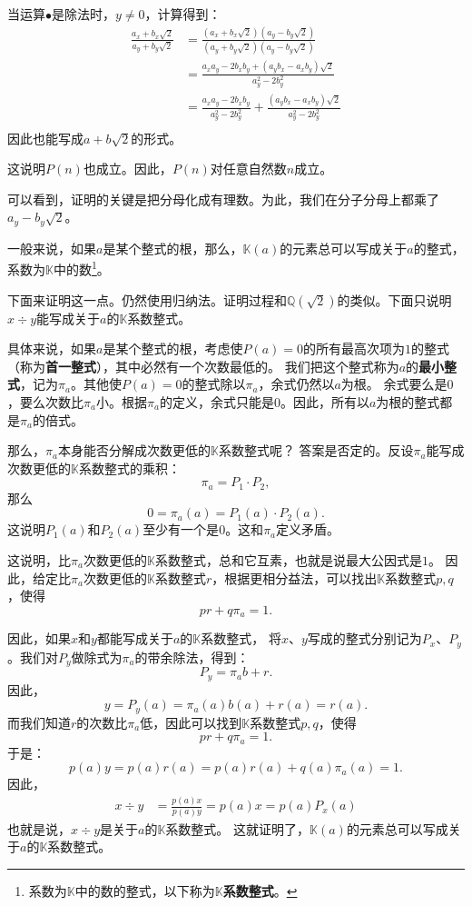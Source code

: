 \documentclass[12pt,UTF8]{ctexbook}
\begin{document}
当运算$\bullet$是除法时，$y\neq 0$，计算得到：
\begin{align*}
    \frac{a_x + b_x\sqrt{2}}{a_y + b_y\sqrt{2}} &=  \frac{(a_x + b_x\sqrt{2})(a_y - b_y\sqrt{2})}{(a_y + b_y\sqrt{2})(a_y - b_y\sqrt{2})} \\
    &= \frac{a_xa_y - 2b_xb_y + (a_yb_x - a_xb_y)\sqrt{2}}{a_y^2 - 2b_y^2} \\
    &= \frac{a_xa_y - 2b_xb_y}{a_y^2 - 2b_y^2} + \frac{(a_yb_x - a_xb_y)\sqrt{2}}{a_y^2 - 2b_y^2}\\
\end{align*}
因此也能写成$a + b\sqrt{2}$的形式。

这说明$P(n)$也成立。因此，$P(n)$对任意自然数$n$成立。

可以看到，证明的关键是把分母化成有理数。为此，我们在分子分母上都乘了$a_y - b_y\sqrt{2}$。

一般来说，如果$a$是某个整式的根，那么，$\mathbb{K}(a)$的元素总可以写成关于$a$的整式，
系数为$\mathbb{K}$中的数\footnote{系数为$\mathbb{K}$中的数的整式，以下称为$\mathbb{K}$\textbf{系数整式}。}。

下面来证明这一点。仍然使用归纳法。证明过程和$\mathbb{Q}(\sqrt{2})$的类似。下面只说明$x \div y$能写成关于$a$的$\mathbb{K}$系数整式。

具体来说，如果$a$是某个整式的根，考虑使$P(a) = 0$的所有最高次项为$1$的整式（称为\textbf{首一整式}），其中必然有一个次数最低的。
我们把这个整式称为$a$的\textbf{最小整式}，记为$\pi_a$。其他使$P(a) = 0$的整式除以$\pi_a$，余式仍然以$a$为根。
余式要么是$0$，要么次数比$\pi_a$小。根据$\pi_a$的定义，余式只能是$0$。因此，所有以$a$为根的整式都是$\pi_a$的倍式。

那么，$\pi_a$本身能否分解成次数更低的$\mathbb{K}$系数整式呢？
答案是否定的。反设$\pi_a$能写成次数更低的$\mathbb{K}$系数整式的乘积：
$$\pi_a = P_1 \cdot P_2,$$
那么
$$ 0 = \pi_a(a) = P_1(a) \cdot P_2(a).$$
这说明$P_1(a)$和$P_2(a)$至少有一个是$0$。这和$\pi_a$定义矛盾。

这说明，比$\pi_a$次数更低的$\mathbb{K}$系数整式，总和它互素，也就是说最大公因式是$1$。
因此，给定比$\pi_a$次数更低的$\mathbb{K}$系数整式$r$，根据更相分益法，可以找出$\mathbb{K}$系数整式$p,q$，使得
$$ pr + q\pi_a = 1.$$

因此，如果$x$和$y$都能写成关于$a$的$\mathbb{K}$系数整式，
将$x$、$y$写成的整式分别记为$P_x$、$P_y$。我们对$P_y$做除式为$\pi_a$的带余除法，得到：
$$ P_y = \pi_a b + r.$$
因此，
$$ y = P_y(a) = \pi_a(a) b(a) + r(a) = r(a). $$
而我们知道$r$的次数比$\pi_a$低，因此可以找到$\mathbb{K}$系数整式$p,q$，使得
$$ pr + q\pi_a = 1.$$
于是：
$$ p(a) y = p(a)r(a) = p(a)r(a) + q(a)\pi_a(a) = 1. $$
因此，
\begin{align*}
    x \div y &= \frac{p(a)x}{p(a)y} = p(a)x = p(a)P_x(a)
\end{align*}
也就是说，$x \div y$是关于$a$的$\mathbb{K}$系数整式。
这就证明了，$\mathbb{K}(a)$的元素总可以写成关于$a$的$\mathbb{K}$系数整式。
\end{document}
